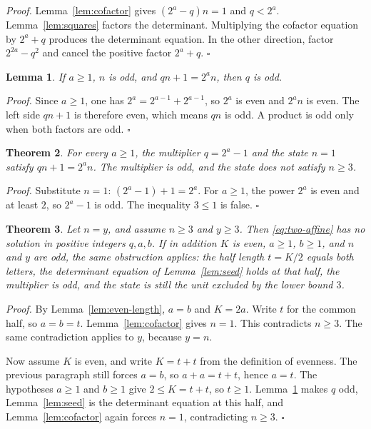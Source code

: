 \documentclass[11pt,letterpaper]{article}
\newtheorem{theorem}{Theorem}
\newtheorem{lemma}[theorem]{Lemma}
\newenvironment{proof}{\noindent\textit{Proof.}}{\hfill\(\square\)}
\begin{document}
\begin{proof}
Lemma~\ref{lem:cofactor} gives \((2^{a} - q) n = 1\) and \(q < 2^{a}\). Lemma~\ref{lem:squares} factors the determinant. Multiplying the cofactor equation by \(2^{a} + q\) produces the determinant equation. In the other direction, factor \(2^{2a} - q^{2}\) and cancel the positive factor \(2^{a} + q\).
\end{proof}

\begin{lemma}
\label{lem:odd-multiplier}
If \(a \ge 1\), \(n\) is odd, and \(q n + 1 = 2^{a} n\), then \(q\) is odd.
\end{lemma}

\begin{proof}
Since \(a \ge 1\), one has \(2^{a} = 2^{a-1} + 2^{a-1}\), so \(2^{a}\) is even and \(2^{a} n\) is even. The left side \(q n + 1\) is therefore even, which means \(q n\) is odd. A product is odd only when both factors are odd.
\end{proof}

\begin{theorem}
\label{thm:unit}
For every \(a \ge 1\), the multiplier \(q = 2^{a} - 1\) and the state \(n = 1\) satisfy \(q n + 1 = 2^{a} n\). The multiplier is odd, and the state does not satisfy \(n \ge 3\).
\end{theorem}

\begin{proof}
Substitute \(n = 1\): \((2^{a} - 1) + 1 = 2^{a}\). For \(a \ge 1\), the power \(2^{a}\) is even and at least \(2\), so \(2^{a} - 1\) is odd. The inequality \(3 \le 1\) is false.
\end{proof}

\begin{theorem}
\label{thm:no-equal}
Let \(n = y\), and assume \(n \ge 3\) and \(y \ge 3\). Then \eqref{eq:two-affine} has no solution in positive integers \(q, a, b\). If in addition \(K\) is even, \(a \ge 1\), \(b \ge 1\), and \(n\) and \(y\) are odd, the same obstruction applies: the half length \(t = K/2\) equals both letters, the determinant equation of Lemma~\ref{lem:seed} holds at that half, the multiplier is odd, and the state is still the unit excluded by the lower bound \(3\).
\end{theorem}

\begin{proof}
By Lemma~\ref{lem:even-length}, \(a = b\) and \(K = 2a\). Write \(t\) for the common half, so \(a = b = t\). Lemma~\ref{lem:cofactor} gives \(n = 1\). This contradicts \(n \ge 3\). The same contradiction applies to \(y\), because \(y = n\).

Now assume \(K\) is even, and write \(K = t + t\) from the definition of evenness. The previous paragraph still forces \(a = b\), so \(a + a = t + t\), hence \(a = t\). The hypotheses \(a \ge 1\) and \(b \ge 1\) give \(2 \le K = t + t\), so \(t \ge 1\). Lemma~\ref{lem:odd-multiplier} makes \(q\) odd, Lemma~\ref{lem:seed} is the determinant equation at this half, and Lemma~\ref{lem:cofactor} again forces \(n = 1\), contradicting \(n \ge 3\).
\end{proof}
\end{document}
